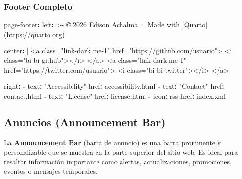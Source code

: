 \documentclass[
  doc,
  floatsintext,
  longtable,
  a4paper,
  nolmodern,
  notxfonts,
  notimes,
  12pt,
  colorlinks=true,linkcolor=blue,citecolor=blue,urlcolor=blue]{apa7}
\newenvironment{Shaded}{\begin{snugshade}}{\end{snugshade}}
\newcommand{\AttributeTok}[1]{\textcolor[rgb]{0.40,0.45,0.13}{#1}}
\newcommand{\CharTok}[1]{\textcolor[rgb]{0.13,0.47,0.30}{#1}}
\newcommand{\FunctionTok}[1]{\textcolor[rgb]{0.28,0.35,0.67}{#1}}
\newcommand{\KeywordTok}[1]{\textcolor[rgb]{0.00,0.23,0.31}{\textbf{#1}}}
\newcommand{\NormalTok}[1]{\textcolor[rgb]{0.00,0.23,0.31}{#1}}
\newcommand{\StringTok}[1]{\textcolor[rgb]{0.13,0.47,0.30}{#1}}
\begin{document}
\subsubsection{Footer Completo}\label{footer-completo}

\begin{Shaded}
\begin{Highlighting}[]
\FunctionTok{page{-}footer}\KeywordTok{:}
\FunctionTok{  left}\KeywordTok{: }\CharTok{\textgreater{}{-}}
\NormalTok{    © 2026 Edison Achalma · Made with [Quarto](https://quarto.org)}
    
\FunctionTok{  center}\KeywordTok{: }\CharTok{|}
\NormalTok{    \textless{}a class="link{-}dark me{-}1" href="https://github.com/usuario"\textgreater{}}
\NormalTok{      \textless{}i class="bi bi{-}github"\textgreater{}\textless{}/i\textgreater{}}
\NormalTok{    \textless{}/a\textgreater{}}
\NormalTok{    \textless{}a class="link{-}dark me{-}1" href="https://twitter.com/usuario"\textgreater{}}
\NormalTok{      \textless{}i class="bi bi{-}twitter"\textgreater{}\textless{}/i\textgreater{}}
\NormalTok{    \textless{}/a\textgreater{}}
    
\AttributeTok{  }\FunctionTok{right}\KeywordTok{:}
\AttributeTok{    }\KeywordTok{{-}}\AttributeTok{ }\FunctionTok{text}\KeywordTok{:}\AttributeTok{ }\StringTok{"Accessibility"}
\AttributeTok{      }\FunctionTok{href}\KeywordTok{:}\AttributeTok{ accessibility.html}
\AttributeTok{    }\KeywordTok{{-}}\AttributeTok{ }\FunctionTok{text}\KeywordTok{:}\AttributeTok{ }\StringTok{"Contact"}
\AttributeTok{      }\FunctionTok{href}\KeywordTok{:}\AttributeTok{ contact.html}
\AttributeTok{    }\KeywordTok{{-}}\AttributeTok{ }\FunctionTok{text}\KeywordTok{:}\AttributeTok{ }\StringTok{"License"}
\AttributeTok{      }\FunctionTok{href}\KeywordTok{:}\AttributeTok{ license.html}
\AttributeTok{    }\KeywordTok{{-}}\AttributeTok{ }\FunctionTok{icon}\KeywordTok{:}\AttributeTok{ rss}
\AttributeTok{      }\FunctionTok{href}\KeywordTok{:}\AttributeTok{ index.xml}
\end{Highlighting}
\end{Shaded}

\subsection{Anuncios (Announcement
Bar)}\label{anuncios-announcement-bar}

La \textbf{Announcement Bar} (barra de anuncio) es una barra prominente
y personalizable que se muestra en la parte superior del sitio web. Es
ideal para resaltar información importante como alertas,
actualizaciones, promociones, eventos o mensajes temporales.
\end{document}
